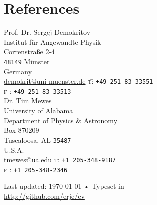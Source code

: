 \documentclass[svgnames, 10pt, a4paper]{article}
\newenvironment{nstabbing}
  {\setlength{\topsep}{0pt}%
   \setlength{\partopsep}{0pt}%
   \tabbing}
  {\endtabbing}
\begin{document}
\section*{References}
\noindent
Prof. Dr. Sergej Demokritov\\
Institut für Angewandte Physik\\
Correnstraße 2-4\\
\texttt{48149} Münster\\
Germany\\
\href{mailto:demokrit@uni-muenster.de}{demokrit@uni-muenster.de}
\begin{nstabbing}
\textsc{t}\= : \texttt{+49 251 83-33551}\\
\textsc{f}\> : \texttt{+49 251 83-33513}\\[.2cm]
\end{nstabbing}
\noindent
Dr. Tim Mewes\\
University of Alabama\\
Department of Physics \& Astronomy\\
Box 870209\\
Tuscaloosa, AL \texttt{35487}\\
U.S.A.\\
\href{mailto:tmewes@ua.edu}{tmewes@ua.edu}
\begin{nstabbing}
\textsc{t}\= : \texttt{+1 205-348-9187}\\
\textsc{f}\> : \texttt{+1 205-348-2346}
\end{nstabbing}
\vfill
\begin{center}
{\scriptsize  Last updated: \today\- •\- 
Typeset in \href{http://nitens.org/taraborelli/cvtex}{
\XeTeX }\\
\href{http://github.com/erje/cv}{http://github.com/erje/cv}}
\end{center}
\end{document}
